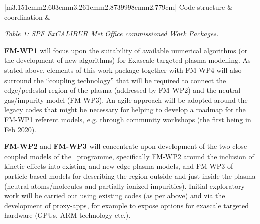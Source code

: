 \documentclass[a4paper]{article}
\makeatletter
\newcommand\arraybslash{\let\\\@arraycr}
\makeatother
\begin{document}
\begin{center}
\begin{supertabular}{|m{3.151cm}m{2.603cm}m{3.261cm}m{2.8739998cm}m{2.779cm}|}
\centering\arraybslash{ Code structure \& coordination}\\\hline
{}\\\hline
{} &
\\\hline
\end{supertabular}
\end{center}

\bigskip

{\centering
\textit{Table 1: SPF ExCALIBUR Met Office commissioned Work Packages.}
\par}


\bigskip

\textbf{FM-WP1} will focus upon the suitability of available numerical 
algorithms (or the development of new algorithms)
for Exascale targeted plasma modelling. As stated above, elements of this work 
package together with FM-WP4 will also
surround the ``coupling technology'' that will be required to connect the 
edge/pedestal region of the plasma (addressed
by FM-WP2) and the neutral gas/impurity model (FM-WP3). An agile approach will 
be adopted around the legacy codes that
might be necessary for helping to develop a roadmap for the FM-WP1 referent 
models, e.g. through community workshops
(the first being in Feb 2020).


\bigskip

\textbf{FM-WP2} and \textbf{FM-WP3} will concentrate upon development of the 
two close coupled models of the \nep \ 
programme, specifically FM-WP2 around the inclusion of kinetic effects into 
existing and new edge plasma models, and
FM-WP3 of particle based models for describing the region outside and just 
inside the plasma (neutral atoms/molecules
and partially ionized impurities). Initial exploratory work will be carried out 
using existing codes (as per above) and
via the development of proxy-apps, for example to expose options for exascale 
targeted hardware (GPUs, ARM technology
etc.).
\end{document}
